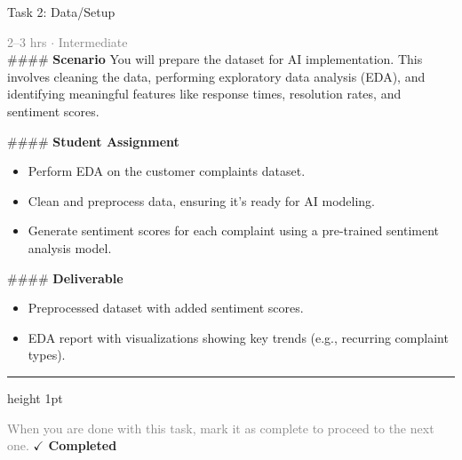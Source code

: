 \documentclass[10pt,a4paper]{article}
\begin{document}
\begin{taskbox}{Task 2: Data/Setup}

    {\small \textcolor{gray}{2--3 hrs $\cdot$ Intermediate}}\\[12pt]

    \#\#\#\# \textbf{Scenario}  
You will prepare the dataset for AI implementation. This involves cleaning the data, performing exploratory data analysis (EDA), and identifying meaningful features like response times, resolution rates, and sentiment scores.  

\#\#\#\# \textbf{Student Assignment}  
\begin{itemize}
    \item Perform EDA on the customer complaints dataset.  
    \item Clean and preprocess data, ensuring it’s ready for AI modeling.  
    \item Generate sentiment scores for each complaint using a pre-trained sentiment analysis model.  
\end{itemize}

\#\#\#\# \textbf{Deliverable}  
\begin{itemize}
    \item Preprocessed dataset with added sentiment scores.  
    \item EDA report with visualizations showing key trends (e.g., recurring complaint types).\par
\end{itemize}

    \vspace{16pt}

    \textcolor{cardBorder}{\hrule height 1pt}\vspace{8pt}

    \small \textcolor{gray}{When you are done with this task, mark it as complete to proceed to the next one.} \hfill \textbf{\textcolor{brandDark}{$\checkmark$ Completed}}

\end{taskbox}
\end{document}
